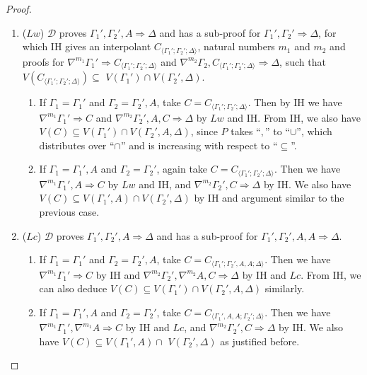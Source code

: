 \documentclass[12pt,a4paper]{article}
\theoremstyle{plain}
\theoremstyle{definition}
\begin{document}
\begin{proof}
\begin{enumerate}
		\item ($Lw$) $\mathcal{D}$ proves $\Gamma_1' , \Gamma_2' , A \Rightarrow \Delta$ and has a sub-proof for $\Gamma_1' , \Gamma_2' \Rightarrow \Delta$, for which IH gives an interpolant $C_{\langle\Gamma_1';\Gamma_2';\Delta\rangle}$, natural numbers $m_1$ and $m_2$ and proofs for $\nabla^{m_1} \Gamma_1' \Rightarrow C_{\langle\Gamma_1';\Gamma_2';\Delta\rangle}$ and $\nabla^{m_2} \Gamma_2 , C_{\langle\Gamma_1';\Gamma_2';\Delta\rangle} \Rightarrow \Delta$, such that $V(C_{\langle\Gamma_1';\Gamma_2';\Delta\rangle}) \subseteq$ $ V(\Gamma_1') \cap V(\Gamma_2' , \Delta)$.
		\begin{enumerate}
			\item If $\Gamma_1 = \Gamma_1'$ and $\Gamma_2 = \Gamma_2' , A$, take $C = C_{\langle\Gamma_1';\Gamma_2';\Delta\rangle}$. Then by IH we have  $\nabla^{m_1} \Gamma_1' \Rightarrow C$ and $\nabla^{m_2} \Gamma_2' , A , C \Rightarrow \Delta$ by $Lw$ and IH. From IH, we also have $V(C) \subseteq V(\Gamma_1') \cap V(\Gamma_2' , A , \Delta)$, since $P$ takes ``$,$'' to ``$\cup$'', which distributes over ``$\cap$'' and is increasing with respect to ``$\subseteq$''.

			\item If $\Gamma_1 = \Gamma_1' , A$ and $\Gamma_2 = \Gamma_2'$, again take $C = C_{\langle\Gamma_1';\Gamma_2';\Delta\rangle}$. Then we have  $\nabla^{m_1} \Gamma_1' , A \Rightarrow C$ by $Lw$ and IH, and $\nabla^{m_2} \Gamma_2' , C \Rightarrow \Delta$ by IH. We also have $V(C) \subseteq V(\Gamma_1' , A) \cap V(\Gamma_2' , \Delta)$ by IH and argument similar to the previous case.
		\end{enumerate}

		\item ($Lc$) $\mathcal{D}$ proves $\Gamma_1' , \Gamma_2' , A \Rightarrow \Delta$ and has a sub-proof for $\Gamma_1' , \Gamma_2' , A , A \Rightarrow \Delta$.
		\begin{enumerate}
			\item If $\Gamma_1 = \Gamma_1'$ and $\Gamma_2 = \Gamma_2' , A$, take $C = C_{\langle\Gamma_1';\Gamma_2',A,A;\Delta\rangle}$. Then we have $\nabla^{m_1} \Gamma_1' \Rightarrow C$ by IH and $\nabla^{m_2}\Gamma_2' , \nabla^{m_2} A , C \Rightarrow \Delta$ by IH and $Lc$. From IH, we can also deduce $V(C) \subseteq V(\Gamma_1') \cap V(\Gamma_2',A,\Delta)$ similarly.
			
			\item If $\Gamma_1 = \Gamma_1' , A$ and $\Gamma_2 = \Gamma_2'$, take $C = C_{\langle\Gamma_1',A,A;\Gamma_2';\Delta\rangle}$. Then we have $\nabla^{m_1} \Gamma_1', \nabla^{m_1} A \Rightarrow C$ by IH and $Lc$, and $\nabla^{m_2} \Gamma_2' , C \Rightarrow \Delta$ by IH. We also have $V(C) \subseteq V(\Gamma_1',A) \cap$ $V(\Gamma_2',\Delta)$ as justified before.
		\end{enumerate}


\end{enumerate}
\end{proof}
\end{document}
